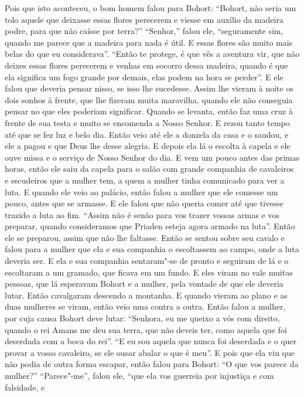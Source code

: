 Pois que isto aconteceu, o bom homem falou para Bohort: “Bohort, não seria um
tolo aquele que deixasse essas flores perecerem e viesse em auxílio da madeira
podre, para que não caísse por terra?” “Senhor,” falou ele, “seguramente sim,
quando me parece que a madeira para nada é útil. E essas flores são muito mais
belas do que eu considerava”. “Então te protege, é que vês a aventura vir, que
não deixes essas flores perecerem e venhas em socorro dessa madeira, quando é
que ela significa um fogo grande por demais, elas podem na hora se perder”. E
ele falou que deveria pensar nisso, se isso lhe sucedesse.
Assim lhe vieram à noite os dois sonhos à frente, que lhe fizeram muita
maravilha, quando ele não conseguia pensar no que eles poderiam significar.
Quando se levanta, então faz uma cruz à frente de sua testa e muito se
encomenda a Nosso Senhor. E rezou tanto tempo até que se fez luz e belo dia.
Então veio até ele a donzela da casa e o saudou, e ele a pagou e que Deus lhe
desse alegria. E depois ela lá o escolta à capela e ele ouve missa e o serviço
de Nosso Senhor do dia. E vem um pouco antes das primas horas, então ele saiu
da capela para o salão com grande companhia de cavaleiros e escudeiros que a
mulher tem, a quem a mulher tinha comunicado para ver a luta. E quando ele veio
ao palácio, então falou a mulher que ele comesse um pouco, antes que se
armasse. E ele falou que não queria comer até que tivesse trazido a luta ao
fim. “Assim não é senão para vos trazer vossas armas e vos preparar, quando
consideramos que Priaden esteja agora armado na luta”. Então ele se preparou,
assim que não lhe faltasse. Então se sentou sobre seu cavalo e falou para a
mulher que ela e sua companhia o escoltassem ao campo, onde a luta deveria ser.
E ela e sua companhia sentaram"-se de pronto e seguiram de lá e o escoltaram a
um gramado, que ficava em um fundo. E eles viram no vale muitas pessoas, que lá
esperavam Bohort e a mulher, pela vontade de que ele deveria lutar. Então
cavalgaram descendo a montanha. E quando vieram ao plano e as duas mulheres se
viram, então veio uma contra a outra. Então falou a mulher, por cuja causa
Bohort deve lutar: “Senhora, eu me queixo a vós com direito, quando o rei Amans
me deu sua terra, que não deveis ter, como aquela que foi deserdada com a boca
do rei”. “E eu sou aquela que nunca foi deserdada e o quer provar a vosso
cavaleiro, se ele ousar abalar o que é meu”. E pois que ela viu que não podia
de outra forma escapar, então falou para Bohort: “O que vos parece da mulher?”
“Parece"-me”, falou ele, “que ela vos guerreia por injustiça e com falsidade, e
